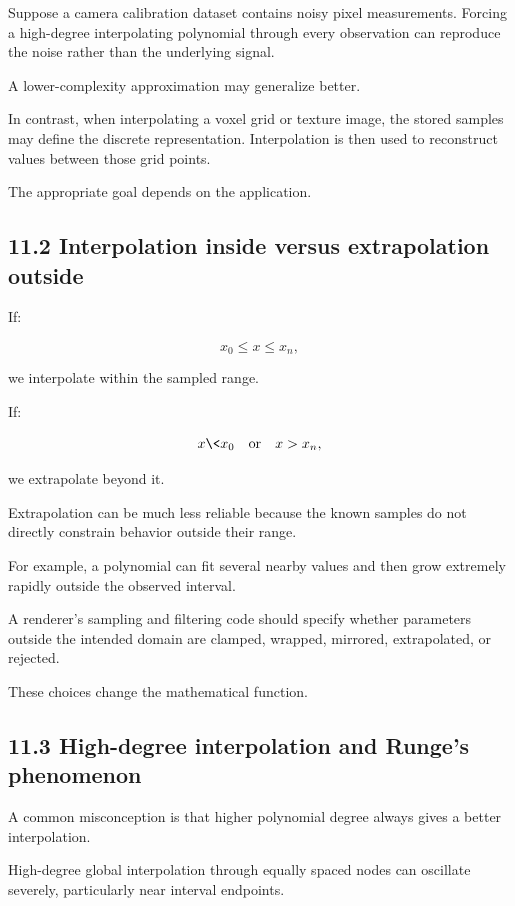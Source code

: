 Suppose a camera calibration dataset contains noisy pixel measurements. Forcing a high-degree interpolating polynomial through every observation can reproduce the noise rather than the underlying signal.

A lower-complexity approximation may generalize better.

In contrast, when interpolating a voxel grid or texture image, the stored samples may define the discrete representation. Interpolation is then used to reconstruct values between those grid points.

The appropriate goal depends on the application.

\subsection{11.2 Interpolation inside versus extrapolation outside}\label{02-foundations-ii-ch028-interpolation-inside-versus-extrapolation-outside}

If:

\[ x_0\le x\le x_n, \]

we interpolate within the sampled range.

If:

\[ x\<x_0 \quad\text{or}\quad x>x_n, \]

we extrapolate beyond it.

Extrapolation can be much less reliable because the known samples do not directly constrain behavior outside their range.

For example, a polynomial can fit several nearby values and then grow extremely rapidly outside the observed interval.

A renderer's sampling and filtering code should specify whether parameters outside the intended domain are clamped, wrapped, mirrored, extrapolated, or rejected.

These choices change the mathematical function.

\subsection{11.3 High-degree interpolation and Runge's phenomenon}\label{02-foundations-ii-ch028-high-degree-interpolation-and-runges-phenomenon}

A common misconception is that higher polynomial degree always gives a better interpolation.

High-degree global interpolation through equally spaced nodes can oscillate severely, particularly near interval endpoints.

